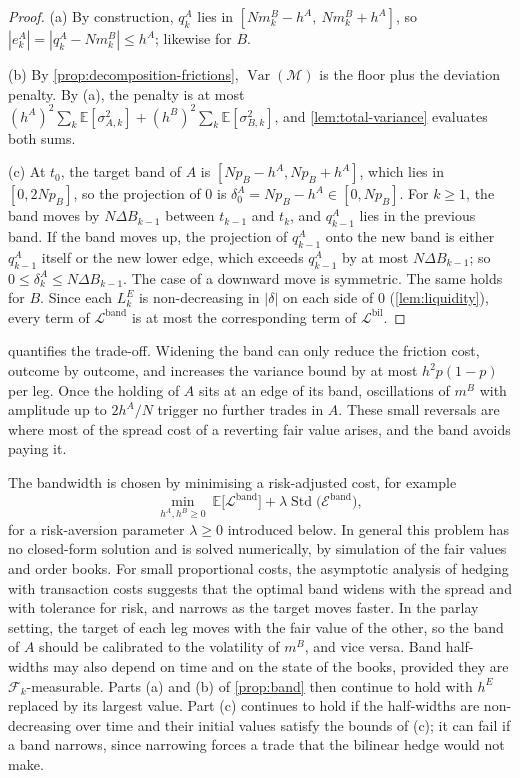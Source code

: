 \documentclass[11pt,a4paper]{article}
\theoremstyle{plain}
\theoremstyle{definition}
\theoremstyle{remark}
\newcommand{\E}{\mathbb{E}}
\newcommand{\1}{\mathbf{1}}
\newcommand{\F}{\mathcal{F}}
\newcommand{\Var}{\operatorname{Var}}
\begin{document}
\begin{proof}
(a) By construction, $q^A_k$ lies in $[Nm^B_k-h^A,\ Nm^B_k+h^A]$, so $|e^A_k| = |q^A_k - Nm^B_k|\leq h^A$; likewise for $B$.

(b) By \cref{prop:decomposition-frictions}, $\Var(\mathcal{M})$ is the floor plus the deviation penalty. By (a), the penalty is at most $(h^A)^2\sum_k\E[\sigma^2_{A,k}] + (h^B)^2\sum_k\E[\sigma^2_{B,k}]$, and \cref{lem:total-variance} evaluates both sums.

(c) At $t_0$, the target band of $A$ is $[Np_B - h^A, Np_B+h^A]$, which lies in $[0,2Np_B]$, so the projection of $0$ is $\delta^A_0 = Np_B - h^A\in[0,Np_B]$. For $k\geq 1$, the band moves by $N\Delta B_{k-1}$ between $t_{k-1}$ and $t_k$, and $q^A_{k-1}$ lies in the previous band. If the band moves up, the projection of $q^A_{k-1}$ onto the new band is either $q^A_{k-1}$ itself or the new lower edge, which exceeds $q^A_{k-1}$ by at most $N\Delta B_{k-1}$; so $0\leq\delta^A_k\leq N\Delta B_{k-1}$. The case of a downward move is symmetric. The same holds for $B$. Since each $L^E_k$ is non-decreasing in $|\delta|$ on each side of $0$ (\cref{lem:liquidity}), every term of $\mathcal{L}^{\mathrm{band}}$ is at most the corresponding term of $\mathcal{L}^{\mathrm{bil}}$.
\end{proof}

 quantifies the trade-off. Widening the band can only reduce the friction cost, outcome by outcome, and increases the variance bound by at most $h^2p(1-p)$ per leg. Once the holding of $A$ sits at an edge of its band, oscillations of $m^B$ with amplitude up to $2h^A/N$ trigger no further trades in $A$. These small reversals are where most of the spread cost of a reverting fair value arises, and the band avoids paying it.

The bandwidth is chosen by minimising a risk-adjusted cost, for example
\[
\min_{h^A,h^B\geq 0}\ \E\bigl[\mathcal{L}^{\mathrm{band}}\bigr] + \lambda\operatorname{Std}\bigl(\mathcal{E}^{\mathrm{band}}\bigr),
\]
for a risk-aversion parameter $\lambda\geq 0$ introduced below. In general this problem has no closed-form solution and is solved numerically, by simulation of the fair values and order books. For small proportional costs, the asymptotic analysis of hedging with transaction costs \cite{DavisPanasZariphopoulou1993,WhalleyWilmott1997} suggests that the optimal band widens with the spread and with tolerance for risk, and narrows as the target moves faster. In the parlay setting, the target of each leg moves with the fair value of the other, so the band of $A$ should be calibrated to the volatility of $m^B$, and vice versa. Band half-widths may also depend on time and on the state of the books, provided they are $\F_k$-measurable. Parts (a) and (b) of \cref{prop:band} then continue to hold with $h^E$ replaced by its largest value. Part (c) continues to hold if the half-widths are non-decreasing over time and their initial values satisfy the bounds of (c); it can fail if a band narrows, since narrowing forces a trade that the bilinear hedge would not make.
\end{document}
